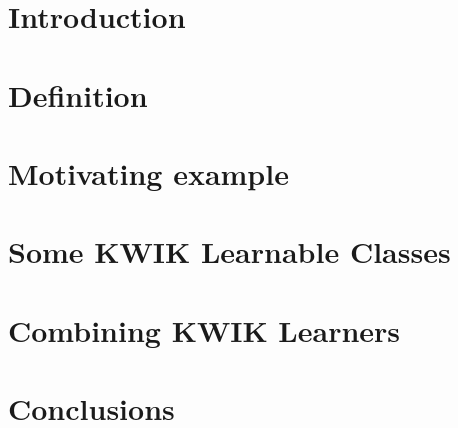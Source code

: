 \documentclass[twoside]{project}
\date{\today}
\begin{document}
\maketitle

\section{Introduction}


\section{Definition}


\section{Motivating example}


\section{Some KWIK Learnable Classes}


\section{Combining KWIK Learners}


\section{Conclusions}


{}

\end{document}
